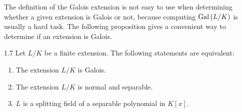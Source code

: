 \documentclass[twoside = false,	%
		headsepline,		%
		parskip = true,
		]{scrbook}						%
\begin{document}
        The definition of the Galois extension is not easy to use when determining whether a given extension is Galois or not, because computing $\mathrm{Gal}\left( L/K\right)$ is usually a hard task. The following proposition gives a convenient way to determine if an extension is Galois.

        \begin{proposition}{}{1.7}
        	Let $L/K$ be a finite extension. The following statements are equivalent:
        	\begin{enumerate}
        		\item The extension $L/K$ is Galois.
        		\item The extension $L/K$ is normal and separable.
        		\item $L$ is a splitting field of a separable polynomial in $K[x]$.
        	\end{enumerate}
        \end{proposition}
\end{document}
